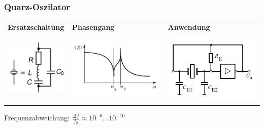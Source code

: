 	\subsubsection{Quarz-Oszilator}
		\begin{tabular}{lll}
			\textbf{Ersatzschaltung} & \textbf{Phasengang} & \textbf{Anwendung} \\
			\begin{minipage}{6cm}
				\includegraphics[width=3cm]{./bilder/osziCrystal.png}
			\end{minipage} &
			\begin{minipage}{6cm}
				\includegraphics[width=5cm]{./bilder/quarz-kennl.png}
			\end{minipage} & 
			\begin{minipage}{6cm}
					\includegraphics[width=5cm]{./bilder/quarz-schaltung.png}
			\end{minipage}	\\
		\end{tabular}	
			
		Frequenzabweichung: $\frac{\Delta f}{f_0} \approx 10^{-6} \dots 10^{-10}$ \\
		
